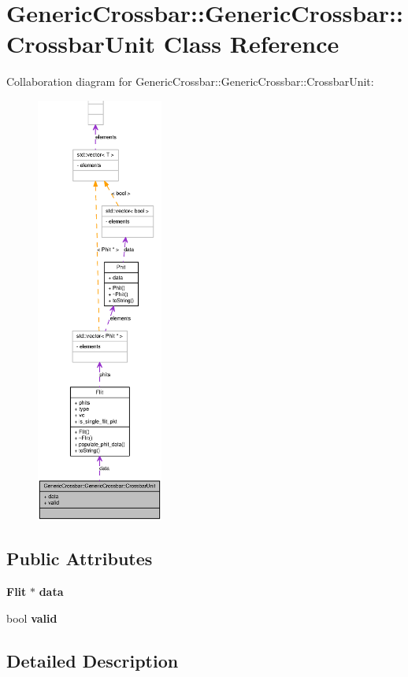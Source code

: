 \section{GenericCrossbar::GenericCrossbar::CrossbarUnit Class Reference}
\label{classGenericCrossbar_1_1CrossbarUnit}
Collaboration diagram for GenericCrossbar::GenericCrossbar::CrossbarUnit:\nopagebreak
\begin{figure}[H]
\begin{center}
\leavevmode
\includegraphics[height=400pt]{classGenericCrossbar_1_1CrossbarUnit__coll__graph}
\end{center}
\end{figure}
\subsection*{Public Attributes}
\begin{CompactItemize}
\item 
{\bf Flit} $\ast$ {\bf data}
\item 
bool {\bf valid}
\end{CompactItemize}


\subsection{Detailed Description}



